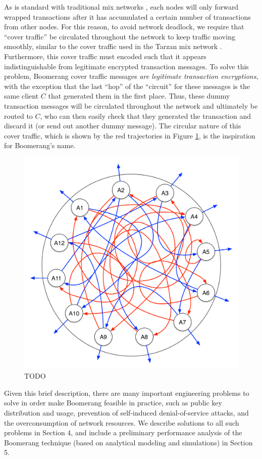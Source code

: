 As is standard with traditional mix networks \cite{Chaum81-Mix}, each nodes will only forward wrapped transactions after it has accumulated a certain number of transactions from other nodes. For this reason, to avoid network deadlock, we require that ``cover traffic'' be circulated throughout the network to keep traffic moving smoothly, similar to the cover traffic used in the Tarzan mix network \cite{tarzan}. Furthermore, this cover traffic must encoded such that it appears indistinguishable from legitimate encrypted transaction messages. To solve this problem, Boomerang cover traffic messages \emph{are legitimate transaction encryptions}, with the exception that the last ``hop'' of the ``circuit'' for these messages is the same client $C$ that generated them in the first place. Thus, these dummy transaction messages will be circulated throughout the network and ultimately be routed to $C$, who can then easily check that they generated the transaction and discard it (or send out another dummy message). The circular nature of this cover traffic, which is shown by the red trajectories in Figure \ref{fig:boomerang_net}, is the inspiration for Boomerang's name.

\begin{figure}[ht!]
\begin{center}
\includegraphics[scale=0.25]{./images/boomerang_net.pdf}
\caption{TODO}
\label{fig:boomerang_net}
\end{center}
\end{figure}

Given this brief description, there are many important engineering problems to solve in order make Boomerang feasible in practice, such as public key distribution and usage, prevention of self-induced denial-of-service attacks, and the overconsumption of network resources. We describe solutions to all such problems in Section 4, and include a preliminary performance analysis of the Boomerang technique (based on analytical modeling and simulations) in Section 5. 
